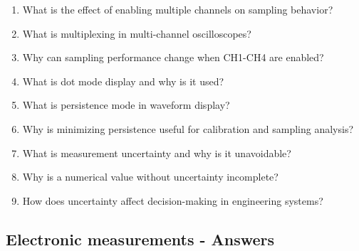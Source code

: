 \documentclass[../main.tex]{subfiles}
\begin{document}
\begin{enumerate}[label=\textbf{\arabic*.}]
	\item What is the effect of enabling multiple channels on sampling behavior?
	\item What is multiplexing in multi-channel oscilloscopes?
	\item Why can sampling performance change when CH1-CH4 are enabled?
	\item What is dot mode display and why is it used?
	\item What is persistence mode in waveform display?
	\item Why is minimizing persistence useful for calibration and sampling analysis?
	\item What is measurement uncertainty and why is it unavoidable?
	\item Why is a numerical value without uncertainty incomplete?
	\item How does uncertainty affect decision-making in engineering systems?
\end{enumerate}

	







\subsection{Electronic measurements - Answers}
\end{document}
